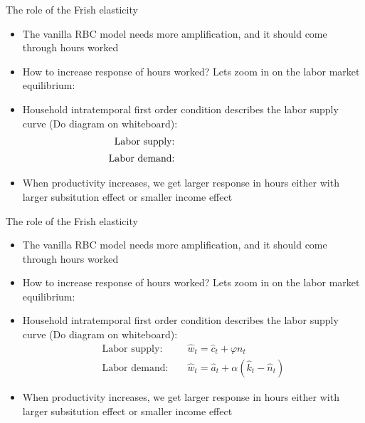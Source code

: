 \documentclass[9pt,xcolor={dvipsnames}]{beamer}
\newcommand{\bit}{\begin{itemize}}
\newcommand{\eit}{\end{itemize}}
\newcommand{\bc}{\color{blue}}
\newcommand{\rc}{\color{red}}
\newcommand{\wc}{\color{white}}
\begin{document}
\begin{frame}{The role of the Frish elasticity}

\bit
\setlength\itemsep{1.5em}

\item The vanilla RBC model needs more amplification, and it should come through hours worked

\item How to increase response of hours worked? Lets zoom in on the labor market equilibrium:

\item Household intratemporal first order condition describes the labor supply curve {\rc (Do diagram on whiteboard)}:
\begin{eqnarray}
\text{Labor supply:   }&& {\wc \hat w_t = \hat c_t + \varphi n_t} \nonumber \\
\text{Labor demand:   }&& {\wc \hat w_t = \hat a_t + \alpha (\hat k_t-\hat n_t)} \nonumber 
\end{eqnarray}

\item {\wc When productivity increases, we get larger response in hours either with larger subsitution effect or smaller income effect}


\eit

\end{frame}

\begin{frame}{The role of the Frish elasticity}

\bit
\setlength\itemsep{1.5em}

\item The vanilla RBC model needs more amplification, and it should come through hours worked

\item How to increase response of hours worked? Lets zoom in on the labor market equilibrium:

\item Household intratemporal first order condition describes the labor supply curve {\rc (Do diagram on whiteboard)}:
\begin{eqnarray}
\text{Labor supply:   }&& \hat w_t = \hat c_t + \varphi n_t \nonumber \\
\text{Labor demand:   }&& \hat w_t = \hat a_t + \alpha (\hat k_t-\hat n_t) \nonumber 
\end{eqnarray}

\item When productivity increases, we get larger response in hours either with larger {\bc subsitution effect} or smaller {\bc income effect}


\eit

\end{frame}
\end{document}
